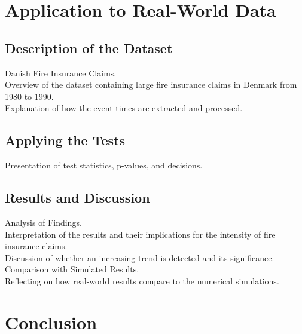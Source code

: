 \documentclass{journalstyle}
\begin{document}
\section{Application to Real-World Data}

\subsection{Description of the Dataset}
Danish Fire Insurance Claims. \\
Overview of the dataset containing large fire insurance claims in Denmark from 1980 to 1990. \\
Explanation of how the event times are extracted and processed.

\subsection{Applying the Tests}
Presentation of test statistics, p-values, and decisions. \\

\subsection{Results and Discussion}
Analysis of Findings. \\
Interpretation of the results and their implications for the intensity of fire insurance claims. \\
Discussion of whether an increasing trend is detected and its significance. \\
Comparison with Simulated Results. \\
Reflecting on how real-world results compare to the numerical simulations.



\section{Conclusion}




\printbibliography
\end{document}

